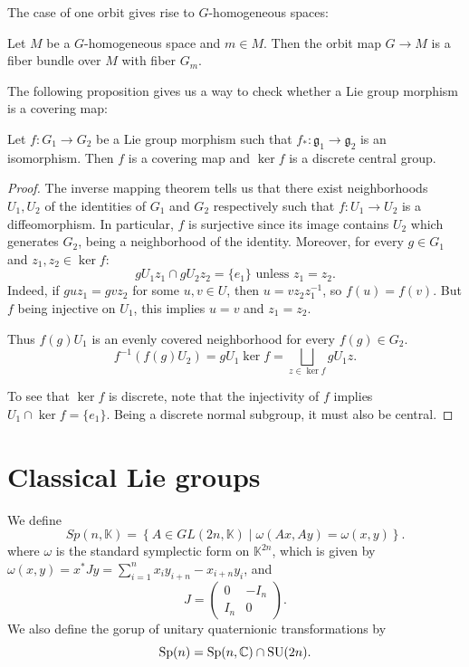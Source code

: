 \documentclass{report}
\begin{document}
The case of one orbit gives rise to $G$-homogeneous spaces:
\begin{theorem}
    Let $M$ be a $G$-homogeneous space and $m \in M$.
    Then the orbit map $G \to M$ is a fiber bundle over $M$ with fiber $G_m$.
\end{theorem}

The following proposition gives us a way to check whether a Lie group morphism is a covering map:
\begin{proposition}\label{prop:covering_map_criterion}
    Let $f:G_1 \to G_2$ be a Lie group morphism such that $f_*: \mathfrak g_1 \to \mathfrak g_2$ is an isomorphism.
    Then $f$ is a covering map and $\ker f$ is a discrete central group.
\end{proposition}
\begin{proof}
    The inverse mapping theorem tells us that there exist neighborhoods $U_1, U_2$ of the identities of $G_1$ and $G_2$ respectively such that $f:U_1 \to U_2$ is a diffeomorphism.
    In particular, $f$ is surjective since its image contains $U_2$ which generates $G_2$, being a neighborhood of the identity.
    Moreover, for every $g \in G_1$ and $z_1, z_2 \in \ker f$:
    \[
        gU_1 z_1 \cap gU_2 z_2 = \{e_1\} \text{ unless } z_1 = z_2.
    \]
    Indeed, if $g u z_1 = g v z_2$ for some $u, v \in U$, then $u = v z_2 z_1^{-1}$, so $f(u) = f(v)$.
    But $f$ being injective on $U_1$, this implies $u = v$ and $z_1 = z_2$.

    Thus $f(g)U_1$ is an evenly covered neighborhood for every $f(g) \in G_2$.
    \[
    f^{-1}(f(g)U_2) = g U_1 \ker f = \bigsqcup_{z \in \ker f} g U_1 z.
    \]

    To see that $\ker f$ is discrete, note that the injectivity of $f$ implies $U_1 \cap \ker f = \{ e_1 \}$.
    Being a discrete normal subgroup, it must also be central.
\end{proof}

\section{Classical Lie groups}

\begin{definition}
    We define
    \[
    Sp(n, \mathbb K) = 
    \left\{
        A \in GL(2n, \mathbb K) \mid \omega(Ax, Ay) = \omega(x, y)
    \right\}.
    \]
    where $\omega$ is the standard symplectic form on $\mathbb K^{2n}$, which is given by
    $\omega(x, y) = x^* J y = \sum_{i=1}^n x_i y_{i+n} - x_{i+n}y_i$, 
    and 
    \[
    J = 
    \begin{pmatrix}
    0 & -I_n \\
    I_n & 0
    \end{pmatrix}.
    \]
    We also define the gorup of unitary quaternionic transformations by
    \[
    \operatorname{{\mathrm{Sp}}}(n) = \operatorname{{\mathrm{Sp}}}(n, \mathbb C) \cap \operatorname{{\mathrm{SU}}}(2n).
    \]
\end{definition}
\end{document}
